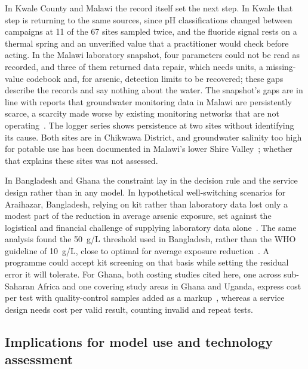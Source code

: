 \documentclass[10pt,letterpaper]{article}
\begin{document}
In Kwale County and Malawi the record itself set the next step. In Kwale that step is returning to the same sources, since pH classifications changed between campaigns at 11 of the 67 sites sampled twice, and the fluoride signal rests on a thermal spring and an unverified value that a practitioner would check before acting. In the Malawi laboratory snapshot, four parameters could not be read as recorded, and three of them returned data repair, which needs units, a missing-value codebook and, for arsenic, detection limits to be recovered; these gaps describe the records and say nothing about the water. The snapshot's gaps are in line with reports that groundwater monitoring data in Malawi are persistently scarce, a scarcity made worse by existing monitoring networks that are not operating~\cite{Robertson2026-PLOSW0000593}. The logger series shows persistence at two sites without identifying its cause. Both sites are in Chikwawa District, and groundwater salinity too high for potable use has been documented in Malawi's lower Shire Valley~\cite{BGS-Earthwise-Malawi}; whether that explains these sites was not assessed.

In Bangladesh and Ghana the constraint lay in the decision rule and the service design rather than in any model. In hypothetical well-switching scenarios for Araihazar, Bangladesh, relying on kit rather than laboratory data lost only a modest part of the reduction in average arsenic exposure, set against the logistical and financial challenge of supplying laboratory data alone~\cite{Jameel2021}. The same analysis found the 50~\textmu{}g/L threshold used in Bangladesh, rather than the WHO guideline of 10~\textmu{}g/L, close to optimal for average exposure reduction~\cite{Jameel2021}. A programme could accept kit screening on that basis while setting the residual error it will tolerate. For Ghana, both costing studies cited here, one across sub-Saharan Africa and one covering study areas in Ghana and Uganda, express cost per test with quality-control samples added as a markup~\cite{Delaire2017,Trimmer2024}, whereas a service design needs cost per valid result, counting invalid and repeat tests.

\subsection*{Implications for model use and technology assessment}
\end{document}
